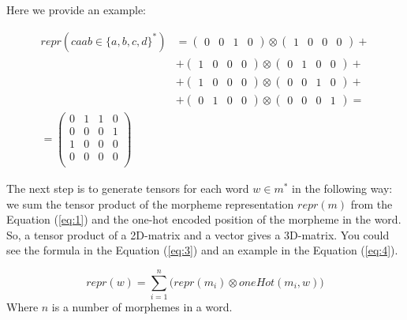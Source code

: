 \documentclass[leqno]{article}
\begin{document}
Here we provide an example:

\begin{equation}
    \begin{aligned}
        repr(caab \in \{a, b, c, d\}^*) &= 
        \begin{pmatrix} 0 & 0 & 1 & 0 \end{pmatrix}
        \otimes \begin{pmatrix} 1 & 0 & 0 & 0 \end{pmatrix} + \\
        &+ \begin{pmatrix} 1 & 0 & 0 & 0 \end{pmatrix}
        \otimes \begin{pmatrix} 0 & 1 & 0 & 0 \end{pmatrix} + \\
        &+ \begin{pmatrix} 1 & 0 & 0 & 0 \end{pmatrix}
        \otimes \begin{pmatrix} 0 & 0 & 1 & 0 \end{pmatrix} + \\
        &+ \begin{pmatrix} 0 & 1 & 0 & 0 \end{pmatrix}
        \otimes \begin{pmatrix} 0 & 0 & 0 & 1 \end{pmatrix} = \\
        = \begin{pmatrix}
        0 & 1 & 1 & 0 \\
        0 & 0 & 0 & 1 \\
        1 & 0 & 0 & 0 \\
        0 & 0 & 0 & 0 \\
        \end{pmatrix}
    \end{aligned}
\end{equation}

The next step is to generate tensors for each word $w \in m^*$ in the following way: we sum the tensor product of the morpheme representation $repr(m)$
from the Equation (\ref{eq:1}) and the one-hot encoded position of the morpheme
in the word. So, a tensor product of a 2D-matrix and a vector gives
a 3D-matrix. You could see the formula in the Equation (\ref{eq:3}) and
an example in the Equation (\ref{eq:4}).

\begin{equation}\label{eq:3}
    repr(w) = \sum_{i=1}^{n}
    \bigg(repr(m_i) \otimes oneHot(m_i, w)\bigg)
\end{equation}
Where $n$ is a number of morphemes in a word.
\end{document}
